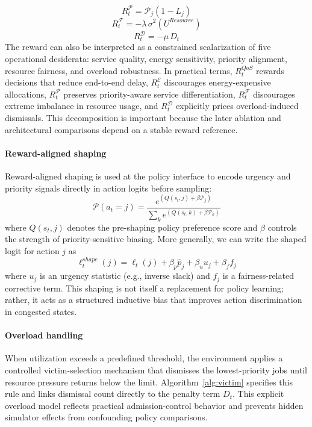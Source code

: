 \documentclass[journal]{IEEEtran}
\begin{document}
\begin{equation}
R_t^{\mathcal{P}} = \mathcal{P}_j (1 - L_j) \label{eq:priorityreward}
\end{equation}
\begin{equation}
R_t^{\mathcal{F}} = -\lambda\, \sigma^2(U^{Resource}) \label{eq:rewardfairness}
\end{equation}
\begin{equation}
R_t^{\mathcal{D}} = -\mu\, D_t \label{eq:rewarddismissal}
\end{equation}
The reward can also be interpreted as a constrained scalarization of five operational desiderata: service quality, energy sensitivity, priority alignment, resource fairness, and overload robustness. In practical terms, $R_t^{QoS}$ rewards decisions that reduce end-to-end delay, $R_t^{\mathcal{E}}$ discourages energy-expensive allocations, $R_t^{\mathcal{P}}$ preserves priority-aware service differentiation, $R_t^{\mathcal{F}}$ discourages extreme imbalance in resource usage, and $R_t^{\mathcal{D}}$ explicitly prices overload-induced dismissals. This decomposition is important because the later ablation and architectural comparisons depend on a stable reward reference.

\paragraph{Reward-aligned shaping}
Reward-aligned shaping is used at the policy interface to encode urgency and priority signals directly in action logits before sampling:
\begin{equation}
\mathcal{P}(a_t = j) = \frac{e^{{(Q(s_t,j) + \beta \mathcal{P}_j)}}}{\sum_k e^{{(Q(s_t,k) + \beta \mathcal{P}_k)}}} \label{eq:softmax}
\end{equation}
where $Q(s_t,j)$ denotes the pre-shaping policy preference score and $\beta$ controls the strength of priority-sensitive biasing. More generally, we can write the shaped logit for action $j$ as
\begin{equation}
\ell_t^{shape}(j) = \ell_t(j) + \beta_p \hat{p}_j + \beta_u u_j + \beta_f f_j
\end{equation}
where $u_j$ is an urgency statistic (e.g., inverse slack) and $f_j$ is a fairness-related corrective term. This shaping is not itself a replacement for policy learning; rather, it acts as a structured inductive bias that improves action discrimination in congested states.

\paragraph{Overload handling}
When utilization exceeds a predefined threshold, the environment applies a controlled victim-selection mechanism that dismisses the lowest-priority jobs until resource pressure returns below the limit. Algorithm~\ref{alg:victim} specifies this rule and links dismissal count directly to the penalty term $D_t$. This explicit overload model reflects practical admission-control behavior and prevents hidden simulator effects from confounding policy comparisons.
\end{document}
